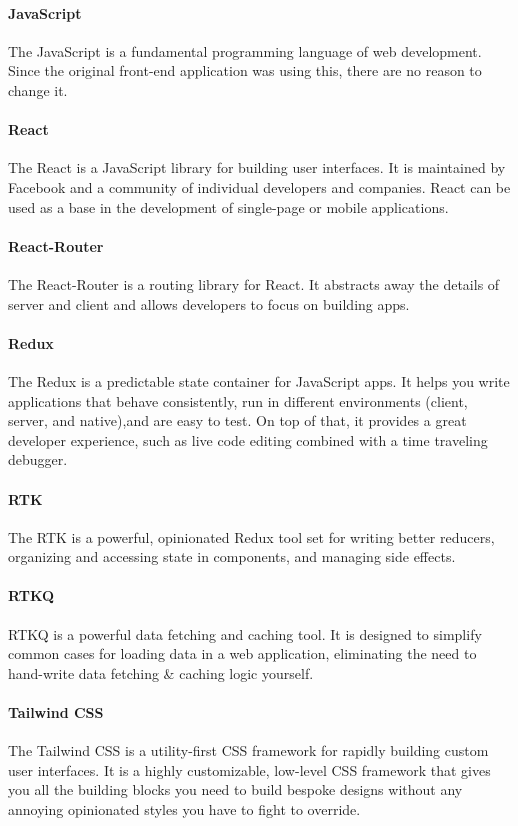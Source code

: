 \paragraph{JavaScript}
The JavaScript is a fundamental programming language of web development.
Since the original front-end application was using this, there are no reason to change it.

\paragraph{React} 
The React is a JavaScript library for building user interfaces. 
It is maintained by Facebook and a community of individual developers and companies.
React can be used as a base in the development of single-page or mobile applications.

\paragraph{React-Router} 
The React-Router is a routing library for React.
It abstracts away the details of server and client and allows developers 
to focus on building apps.

\paragraph{Redux}
The Redux is a predictable state container for JavaScript apps.
It helps you write applications that behave consistently, 
run in different environments (client, server, and native),and are easy to test.
On top of that, it provides a great developer experience, 
such as live code editing combined with a time traveling debugger.

\paragraph{RTK} 
The RTK is a powerful, opinionated Redux tool set for writing better reducers,
organizing and accessing state in components, and managing side effects.

\paragraph{RTKQ}
RTKQ is a powerful data fetching and caching tool.
It is designed to simplify common cases for loading data in a web application, 
eliminating the need to hand-write data fetching \& caching logic yourself.


\paragraph{Tailwind CSS} 
The Tailwind CSS is a utility-first CSS framework for rapidly building custom user interfaces.
It is a highly customizable, low-level CSS framework that gives you all the building blocks 
you need to build bespoke designs without any annoying opinionated styles you have to fight to override.


